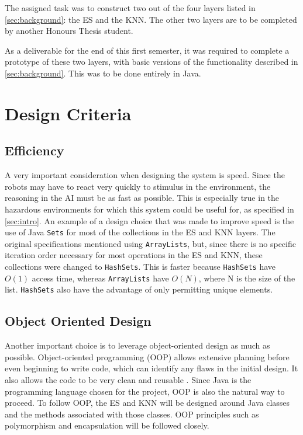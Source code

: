 \documentclass[titlepage,11pt]{article}
\newcommand{\code}[1]{\texttt{#1}}
\begin{document}
The assigned task was to construct two out of the four layers listed in \autoref{sec:background}: the ES and the KNN. The other two layers are to be completed by another Honours Thesis student.

As a deliverable for the end of this first semester, it was required to complete a prototype of these two layers, with basic versions of the functionality described in \autoref{sec:background}. This was to be done entirely in Java.

\section{Design Criteria}

\subsection{Efficiency}

A very important consideration when designing the system is speed. Since the robots may have to react very quickly to stimulus in the environment, the reasoning in the AI must be as fast as possible. This is especially true in the hazardous environments for which this system could be useful for, as specified in \autoref{sec:intro}. An example of a design choice that was made to improve speed is the use of Java \code{Sets} for most of the collections in the ES and KNN layers. The original specifications mentioned using \code{ArrayLists}, but, since there is no specific iteration order necessary for most operations in the ES and KNN, these collections were changed to \code{HashSets}. This is faster because \code{HashSets} have $O(1)$ access time, whereas \code{ArrayLists} have $O(N)$, where N is the size of the list. \code{HashSets} also have the advantage of only permitting unique elements.

\subsection{Object Oriented Design}

Another important choice is to leverage object-oriented design as much as possible. Object-oriented programming (OOP) allows extensive planning before even beginning to write code, which can identify any flaws in the initial design. It also allows the code to be very clean and reusable \cite{oop}. Since Java is the programming language chosen for the project, OOP is also the natural way to proceed. To follow OOP, the ES and KNN will be designed around Java classes and the methods associated with those classes. OOP principles such as polymorphism and encapsulation will be followed closely.
\end{document}
